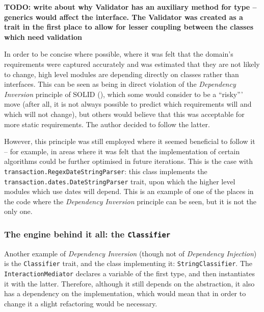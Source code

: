 \textbf{TODO: write about why Validator has an auxiliary method for type --
generics would affect the interface. The Validator was created as a trait in
the first place to allow for lesser coupling between the classes which need
validation}


In order to be concise where possible, where it was felt that the domain's
requirements were captured accurately and was estimated that they are not
likely to change, high level modules are depending directly on classes rather
than interfaces. This can be seen as being in direct violation of the
\emph{Dependency Inversion} principle of SOLID
(\cite[][]{martin1996dependency}), which some would consider to be a ``risky'''
move (after all, it is not always possible to predict which requirements will
and which will not change), but others would believe that this was acceptable
for more static requirements. The author decided to follow the latter.

\begin{sloppypar}
  However, this principle was still employed where it seemed beneficial to
  follow it -- for example, in areas where it was felt that the implementation
  of certain algorithms could be further optimised in future iterations. This
  is the case with \texttt{transaction.RegexDateStringParser}: this class
  implements the \texttt{transaction.dates.DateStringParser} trait, upon which
  the higher level modules which use dates will depend. This is an example of
  one of the places in the code where the \emph{Dependency Inversion} principle
  can be seen, but it is not the only one.
\end{sloppypar}


\subsubsection{The engine behind it all: the \texttt{Classifier}}

Another example of \emph{Dependency Inversion} (though not of \emph{Dependency
Injection}) is the \texttt{Classifier} trait, and the class implementing it:
\texttt{StringClassifier}. The \texttt{InteractionMediator} declares a variable
of the first type, and then instantiates it with the latter. Therefore,
although it still depends on the abstraction, it also has a dependency on the
implementation, which would mean that in order to change it a slight
refactoring would be necessary.

